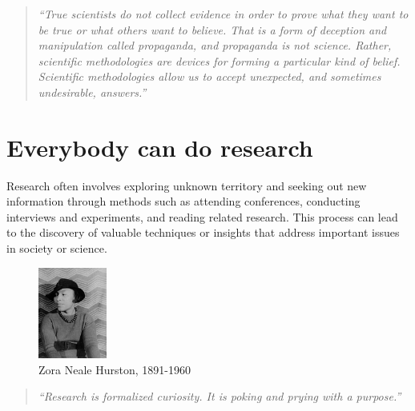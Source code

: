 \documentclass[
  12pt,
  oneside]{book}
\theoremstyle{definition}
\theoremstyle{definition}
\theoremstyle{definition}
\theoremstyle{definition}
\theoremstyle{remark}
\begin{document}
\begin{quote}
\emph{``True scientists do not collect evidence in order to prove what they want to be true or what others want to believe. That is a form of deception and manipulation called propaganda, and propaganda is not science. Rather, scientific methodologies are devices for forming a particular kind of belief. Scientific methodologies allow us to accept unexpected, and sometimes undesirable, answers.''} \citep[p.~10]{Cunningham2021Causal}
\end{quote}

\hypertarget{everybody-can-do-research}{%
\section{Everybody can do research}\label{everybody-can-do-research}}

Research often involves exploring unknown territory and seeking out new information through methods such as attending conferences, conducting interviews and experiments, and reading related research. This process can lead to the discovery of valuable techniques or insights that address important issues in society or science.

\begin{figure}
\centering
\includegraphics[width=0.2\textwidth,height=\textheight]{fig/Zora_Neale_Hurston.jpg}
\caption[\label{fig:hurston} Zora Neale Hurston, 1891-1960]{\label{fig:hurston} Zora Neale Hurston, 1891-1960\footnotemark{}}
\end{figure}

\begin{quote}
\emph{``Research is formalized curiosity. It is poking and prying with a purpose.''} \citep{Hurston2010Dust}
\end{quote}
\end{document}
